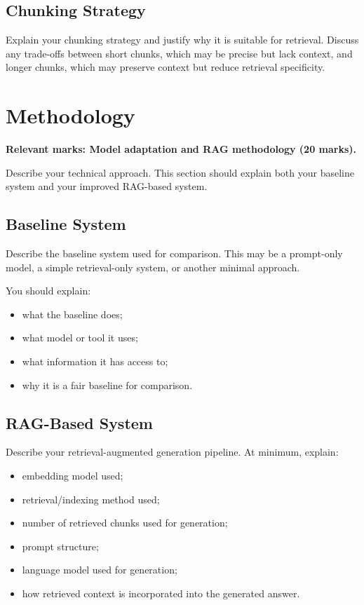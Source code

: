 \documentclass[10pt,conference]{IEEEtran}
\begin{document}
\subsection{Chunking Strategy}

Explain your chunking strategy and justify why it is suitable for retrieval. 
Discuss any trade-offs between short chunks, which may be precise but lack context, and longer chunks, which may preserve context but reduce retrieval specificity.

\section{Methodology}
\label{sec:methodology}

\textbf{Relevant marks: Model adaptation and RAG methodology (20 marks).}

Describe your technical approach. 
This section should explain both your baseline system and your improved RAG-based system.

\subsection{Baseline System}

Describe the baseline system used for comparison. 
This may be a prompt-only model, a simple retrieval-only system, or another minimal approach.

You should explain:

\begin{itemize}
    \item what the baseline does;
    \item what model or tool it uses;
    \item what information it has access to;
    \item why it is a fair baseline for comparison.
\end{itemize}

\subsection{RAG-Based System}

Describe your retrieval-augmented generation pipeline. 
At minimum, explain:

\begin{itemize}
    \item embedding model used;
    \item retrieval/indexing method used;
    \item number of retrieved chunks used for generation;
    \item prompt structure;
    \item language model used for generation;
    \item how retrieved context is incorporated into the generated answer.
\end{itemize}
\end{document}
